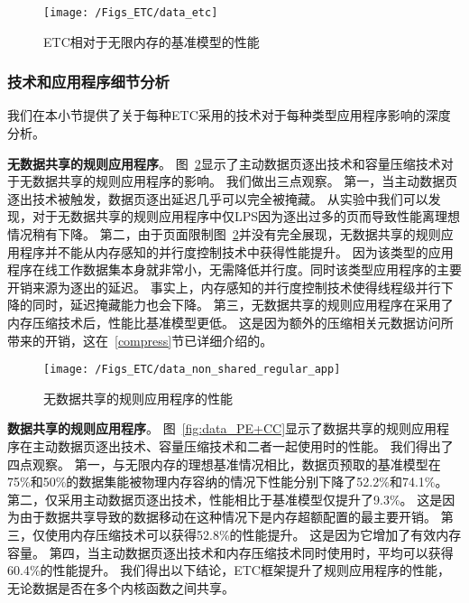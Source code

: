 \begin{figure}[htbp] %
  \centering
  \texttt{[image: /Figs\_ETC/data\_etc]}
  \caption{ETC相对于无限内存的基准模型的性能}
  \label{fig:data_etc}
\end{figure}

\subsubsection{技术和应用程序细节分析}

我们在本小节提供了关于每种ETC采用的技术对于每种类型应用程序影响的深度分析。

\textbf{无数据共享的规则应用程序}。
图~\ref{fig:data_non_shared_regular_app}显示了主动数据页逐出技术和容量压缩技术对于无数据共享的规则应用程序的影响。
我们做出三点观察。
第一，当主动数据页逐出技术被触发，数据页逐出延迟几乎可以完全被掩藏。
从实验中我们可以发现，对于无数据共享的规则应用程序中仅LPS因为逐出过多的页而导致性能离理想情况稍有下降。
第二，由于页面限制图~\ref{fig:data_non_shared_regular_app}并没有完全展现，无数据共享的规则应用程序并不能从内存感知的并行度控制技术中获得性能提升。
因为该类型的应用程序在线工作数据集本身就非常小，无需降低并行度。同时该类型应用程序的主要开销来源为逐出的延迟。
事实上，内存感知的并行度控制技术使得线程级并行下降的同时，延迟掩藏能力也会下降。
第三，无数据共享的规则应用程序在采用了内存压缩技术后，性能比基准模型更低。
这是因为额外的压缩相关元数据访问所带来的开销，这在~\ref{compress}节已详细介绍的。


\begin{figure}[htbp] %
  \centering
  \texttt{[image: /Figs\_ETC/data\_non\_shared\_regular\_app]}
  \caption{无数据共享的规则应用程序的性能}
  \label{fig:data_non_shared_regular_app}
\end{figure}

\textbf{数据共享的规则应用程序}。
图~\ref{fig:data_PE+CC}显示了数据共享的规则应用程序在主动数据页逐出技术、容量压缩技术和二者一起使用时的性能。
我们得出了四点观察。
第一，与无限内存的理想基准情况相比，数据页预取的基准模型在75\%和50\%的数据集能被物理内存容纳的情况下性能分别下降了52.2\%和74.1\%。
第二，仅采用主动数据页逐出技术，性能相比于基准模型仅提升了9.3\%。
这是因为由于数据共享导致的数据移动在这种情况下是内存超额配置的最主要开销。
第三，仅使用内存压缩技术可以获得52.8\%的性能提升。
这是因为它增加了有效内存容量。
第四，当主动数据页逐出技术和内存压缩技术同时使用时，平均可以获得60.4\%的性能提升。
我们得出以下结论，ETC框架提升了规则应用程序的性能，无论数据是否在多个内核函数之间共享。

